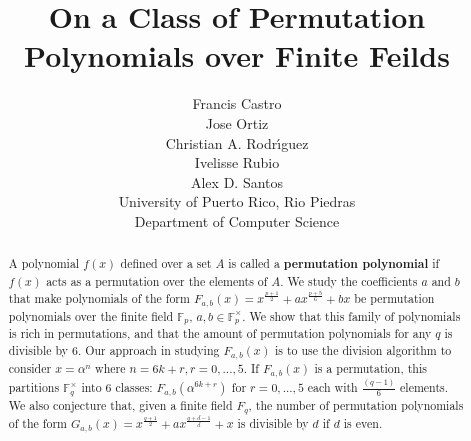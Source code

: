 \documentclass[12pt]{article}
\title{On a Class of Permutation Polynomials over Finite Feilds}
\author{Francis Castro \\ Jose Ortiz \\ Christian A. Rodr\'{\i}guez \\ Ivelisse Rubio \\ Alex D. Santos \\ University of Puerto Rico, Rio Piedras \\ Department of Computer Science}
\date{}
\begin{document}
\maketitle

\begin{abstract}

A polynomial $f(x)$ defined over a set $A$ is called a \textbf{permutation polynomial} if $f(x)$ acts as a permutation over the elements of $A$. We study the coefficients $a$ and $b$ that make polynomials of the form $F_{a,b}(x)=x^{\frac{p+1}{2}} + ax^{\frac{p+5}{6}} + bx$ be permutation polynomials over the finite field $\mathbb{F}_{p}$, $a,b \in \mathbb{F}_{p}^{\times}$. We show that this family of polynomials is rich in permutations, and that the amount of permutation polynomials for any $q$ is divisible by $6$. Our approach in studying $F_{a,b}(x)$ is to use the division algorithm to consider $x=\alpha^{n}$ where $n=6k+r, r=0,...,5$. If $F_{a,b}(x)$ is a permutation, this partitions $\mathbb{F}_{q}^{\times}$ into 6 classes: $F_{a,b}(\alpha^{6k+r})$ for $r=0,...,5$ each with $\frac{(q-1)}{6}$ elements. We also conjecture that, given a finite field $F_q$, the number of permutation polynomials of the form $G_{a,b}(x)=x^{\frac{q+1}{2}} + ax^{\frac{q+d-1}{d}}+x$ is divisible by $d$ if $d$ is even.

\end{abstract}
\end{document}
